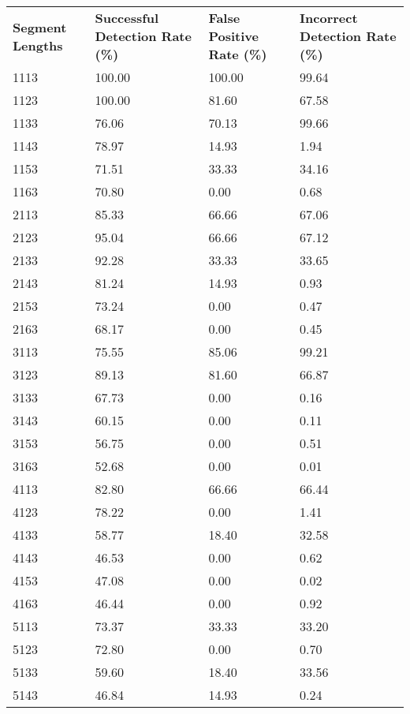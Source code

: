 \begin{appendices}
\begin{longtable}{|p{1.5in}|p{1in}|p{1in}|p{1in}|}
	\hline
	\textbf{Segment Lengths} & \textbf{Successful Detection Rate (\%)} & \textbf{False Positive Rate (\%)} & \textbf{Incorrect Detection Rate (\%)}  \\
	\hhline{|=|=|=|=|}
	1113 & 100.00 & 100.00 & 99.64 \\ \hline
	1123 & 100.00 &  81.60 & 67.58 \\ \hline
	1133 &  76.06 &  70.13 & 99.66 \\ \hline
	1143 &  78.97 &  14.93 &  1.94 \\ \hline
	1153 &  71.51 &  33.33 & 34.16 \\ \hline
	1163 &  70.80 &   0.00 &  0.68 \\ \hline
	2113 &  85.33 &  66.66 & 67.06 \\ \hline
	2123 &  95.04 &  66.66 & 67.12 \\ \hline
	2133 &  92.28 &  33.33 & 33.65 \\ \hline
	2143 &  81.24 &  14.93 &  0.93 \\ \hline
	2153 &  73.24 &   0.00 &  0.47 \\ \hline
	2163 &  68.17 &   0.00 &  0.45 \\ \hline
	3113 &  75.55 &  85.06 & 99.21 \\ \hline
	3123 &  89.13 &  81.60 & 66.87 \\ \hline
	3133 &  67.73 &   0.00 &  0.16 \\ \hline
	3143 &  60.15 &   0.00 &  0.11 \\ \hline
	3153 &  56.75 &   0.00 &  0.51 \\ \hline
	3163 &  52.68 &   0.00 &  0.01 \\ \hline
	4113 &  82.80 &  66.66 & 66.44 \\ \hline
	4123 &  78.22 &   0.00 &  1.41 \\ \hline
	4133 &  58.77 &  18.40 & 32.58 \\ \hline
	4143 &  46.53 &   0.00 &  0.62 \\ \hline
	4153 &  47.08 &   0.00 &  0.02 \\ \hline
	4163 &  46.44 &   0.00 &  0.92 \\ \hline
	5113 &  73.37 &  33.33 & 33.20 \\ \hline
	5123 &  72.80 &   0.00 &  0.70 \\ \hline
	5133 &  59.60 &  18.40 & 33.56 \\ \hline
	5143 &  46.84 &  14.93 &  0.24 \\ \hline

\end{longtable}
\end{appendices}
